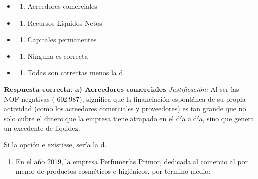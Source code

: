 \documentclass[12pt]{book} %
\providecommand{\tightlist}{%
  \setlength{\itemsep}{0pt}\setlength{\parskip}{0pt}}
\begin{document}
\begin{itemize}
\item
  \begin{enumerate}
  \def\labelenumi{\alph{enumi})}
  \tightlist
  \item
    Acreedores comerciales
  \end{enumerate}
\item
  \begin{enumerate}
  \def\labelenumi{\alph{enumi})}
  \setcounter{enumi}{1}
  \tightlist
  \item
    Recursos Líquidos Netos
  \end{enumerate}
\item
  \begin{enumerate}
  \def\labelenumi{\alph{enumi})}
  \setcounter{enumi}{2}
  \tightlist
  \item
    Capitales permanentes
  \end{enumerate}
\item
  \begin{enumerate}
  \def\labelenumi{\alph{enumi})}
  \setcounter{enumi}{3}
  \tightlist
  \item
    Ninguna es correcta
  \end{enumerate}
\item
  \begin{enumerate}
  \def\labelenumi{\alph{enumi})}
  \setcounter{enumi}{4}
  \tightlist
  \item
    Todas son correctas menos la d.
  \end{enumerate}
\end{itemize}

\textbf{Respuesta correcta: a) Acreedores comerciales}
\emph{Justificación:} Al ser las NOF negativas (-602.987), significa que
la financiación espontánea de su propia actividad (como los acreedores
comerciales y proveedores) es tan grande que no solo cubre el dinero que
la empresa tiene atrapado en el día a día, sino que genera un excedente
de liquidez.

Si la opción e existiese, sería la d.

\begin{enumerate}
\def\labelenumi{\arabic{enumi}.}
\setcounter{enumi}{3}
\tightlist
\item
  En el año 2019, la empresa Perfumerías Primor, dedicada al comercio al
  por menor de productos cosméticos e higiénicos, por término medio:
\end{enumerate}
\end{document}

